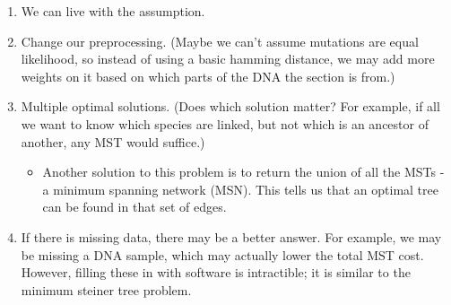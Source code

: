 \documentclass[10pt]{article}
\begin{document}
\begin{enumerate}
	\item We can live with the assumption.
	\item Change our preprocessing.  (Maybe we can't assume mutations are equal likelihood, so instead of using a basic hamming distance, we may add more weights on it based on which parts of the DNA the section is from.)
	\item Multiple optimal solutions.  (Does which solution matter?  For example, if all we want to know which species are linked, but not which is an ancestor of another, any MST would suffice.)
	\begin{itemize}
	    \item Another solution to this problem is to return the union of all the MSTs - a minimum spanning network (MSN).  This tells us that an optimal tree can be found in that set of edges.
    \end{itemize}
    \item If there is missing data, there may be a better answer.  For example, we may be missing a DNA sample, which may actually lower the total MST cost.  However, filling these in with software is intractible; it is similar to the minimum steiner tree problem.
\end{enumerate}
\end{document}
